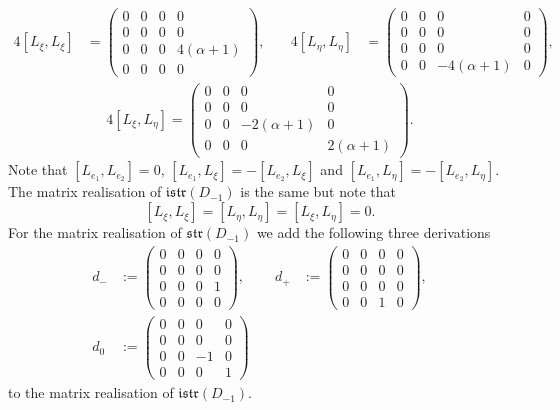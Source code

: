 \documentclass{amsart}
\numberwithin{theorem}{section}
\theoremstyle{definition}
\theoremstyle{remark}
\begin{document}
\begin{align*}
\\
4[L_{\xi},L_{\xi}]&=\left(\begin{array}{cc|cc}
0 & 0 & 0 & 0 \\
0 & 0 & 0 & 0 \\ \hline
0 & 0 & 0 &  4(\alpha + 1) \\
0 & 0 & 0 & 0
\end{array}\right),&\quad
4[L_{\eta},L_{\eta}]&=\left(\begin{array}{cc|cc}
0 & 0 & 0 & 0 \\
0 & 0 & 0 & 0 \\ \hline
0 & 0 & 0 & 0 \\
0 & 0 & - 4( \alpha +1) & 0
\end{array}\right),
\end{align*}\vspace{-1em}\begin{align*}
4[L_{\xi},L_{\eta}]=\left(\begin{array}{cc|cc}
0 & 0 & 0 & 0 \\
0 & 0 & 0 & 0 \\ \hline
0 & 0 & -2(\alpha+1) &  0 \\
0 & 0 & 0 & 2(\alpha+1)
\end{array}\right).
\end{align*}
Note that $[L_{e_1},L_{e_2}]=0$, $[L_{e_1},L_{\xi}]=-[L_{e_2},L_{\xi}]$ and $[L_{e_1},L_{\eta}]=-[L_{e_2},L_{\eta}]$. The matrix realisation of $\mathfrak{istr}(D_{-1})$ is the same but note that 
\[
[L_{\xi},L_{\xi}] = [L_\eta,L_\eta]=[L_\xi,L_\eta]=0.
\]
For the matrix realisation of $\mathfrak{str}(D_{-1})$ we add the following three derivations
\begin{align*}
d_-&:=\left(\begin{array}{cc|cc}
0 & 0 & 0 & 0 \\
0 & 0 & 0 & 0 \\ \hline
0 & 0 & 0 &  1 \\
0 & 0 & 0 & 0
\end{array}\right),&\quad
d_+&:=\left(\begin{array}{cc|cc}
0 & 0 & 0 & 0 \\
0 & 0 & 0 & 0 \\ \hline
0 & 0 & 0 & 0 \\
0 & 0 & 1 & 0
\end{array}\right),\\
d_0&:=\left(\begin{array}{cc|cc}
0 & 0 & 0 & 0 \\
0 & 0 & 0 & 0 \\ \hline
0 & 0 & -1 &  0 \\
0 & 0 & 0 & 1
\end{array}\right)
\end{align*}
to the matrix realisation of $\mathfrak{istr}(D_{-1})$.
\endgroup
\end{document}
